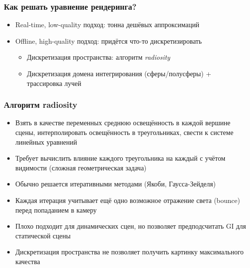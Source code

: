 \documentclass[10pt]{beamer}
\begin{document}
\begin{frame}[fragile]
\frametitle{Как решать уравнение рендеринга?}
\begin{itemize}
\item Real-time, low-quality подход: тонна дешёвых аппроксимаций
\pause
\item Offline, high-quality подход: придётся что-то дискретизировать
\pause
\begin{itemize}
\item Дискретизация пространства: алгоритм \textit{radiosity}
\pause
\item Дискретизация домена интегрирования (сферы/полусферы) + трассировка лучей
\end{itemize}
\end{itemize}
\end{frame}

\begin{frame}[fragile]
\frametitle{Алгоритм radiosity}
\begin{itemize}
\item Взять в качестве переменных среднюю освещённость в каждой вершине сцены, интерполировать освещённость в треугольниках, свести к системе линейных уравнений
\pause
\item Требует вычислить влияние каждого треугольника на каждый с учётом видимости (сложная геометрическая задача)
\pause
\item Обычно решается итеративными методами (Якоби, Гаусса-Зейделя)
\pause
\item Каждая итерация учитывает ещё одно возможное отражение света (bounce) перед попаданием в камеру
\pause
\item Плохо подходит для динамических сцен, но позволяет предподсчитать GI для статической сцены
\pause 
\item Дискретизация пространства не позволяет получить картинку максимального качества
\end{itemize}
\end{frame}
\end{document}
